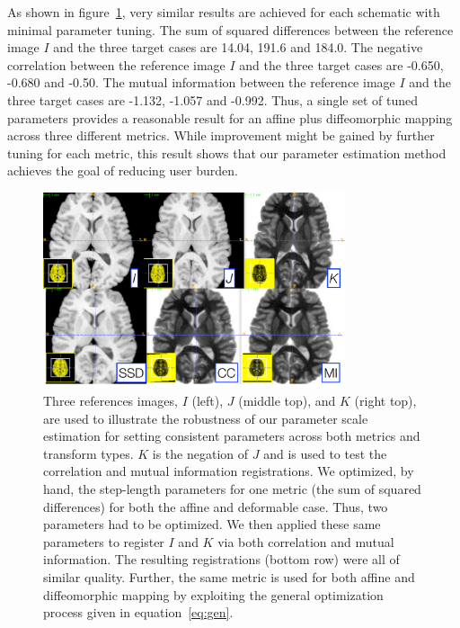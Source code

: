 \documentclass{llncs}
\begin{document}
As shown in figure~\ref{fig:result}, very similar results are achieved
for each schematic with minimal parameter tuning.  The sum of squared differences between the reference
image $I$ and the three target cases are 14.04, 191.6 and 184.0.  The negative correlation between the reference
image $I$ and the three target cases are -0.650, -0.680 and -0.50.  The
mutual information between the reference
image $I$ and the three target cases are -1.132, -1.057 and -0.992.
Thus, a single set of tuned parameters provides a reasonable result
for an affine plus diffeomorphic mapping across three different
metrics.  While improvement might be gained by further tuning for each
metric, this result shows that our parameter estimation method
achieves the goal of reducing user burden.  
\begin{figure}[t]
\begin{center}
\includegraphics[width=3.5in]{figs/three.pdf}
\caption{\baselineskip 12pt \small Three references images, $I$
(left), $J$ (middle top), and $K$ (right top), are used to illustrate
the robustness of our parameter scale estimation for setting
consistent parameters across both metrics and transform types.  $K$ is
the negation of $J$ and is used to test the correlation and mutual
information registrations.  We optimized, by hand, the step-length
parameters for one metric (the sum of squared differences) for both the affine
and deformable case.  Thus, two parameters had to be optimized.  We
then applied these same parameters to register $I$ and $K$ via both
correlation and mutual information.  The resulting registrations
(bottom row) were all of similar quality.  Further, the same metric is
used for both affine and diffeomorphic mapping by exploiting the
general optimization process given in equation~\ref{eq:gen}.}
\label{fig:result}
\end{center}
\end{figure}
\end{document}

